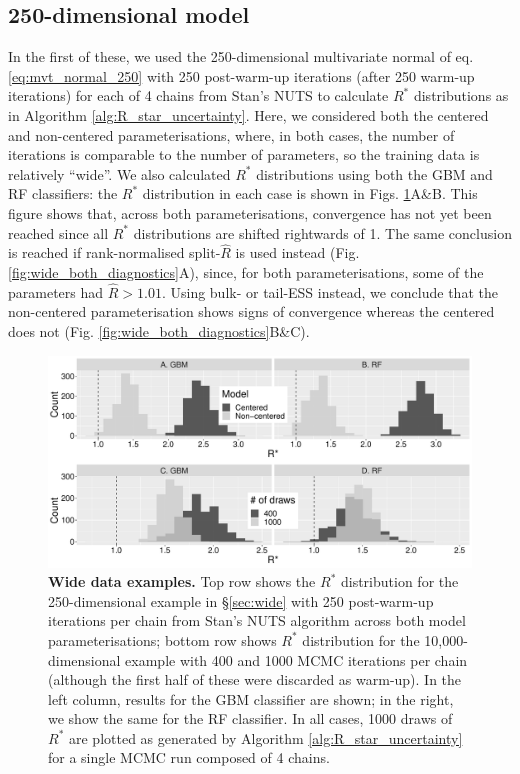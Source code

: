 \documentclass[ba]{imsart}
\numberwithin{equation}{section}
\theoremstyle{plain}
\begin{document}
\begin{supplement}
		\subsection{250-dimensional model}
		In the first of these, we used the 250-dimensional multivariate normal of eq. \eqref{eq:mvt_normal_250} with 250 post-warm-up iterations (after 250 warm-up iterations) for each of 4 chains from Stan's NUTS to calculate $R^*$ distributions as in Algorithm \ref{alg:R_star_uncertainty}. Here, we considered both the centered and non-centered parameterisations, where, in both cases, the number of iterations is comparable to the number of parameters, so the training data is relatively ``wide''. We also calculated $R^*$ distributions using both the GBM and RF classifiers: the $R^*$ distribution in each case is shown in Figs. \ref{fig:mvt_wide_both}A\&B. This figure shows that, across both parameterisations, convergence has not yet been reached since all $R^*$ distributions are shifted rightwards of 1. The same conclusion is reached if rank-normalised split-$\widehat{R}$ is used instead (Fig. \ref{fig:wide_both_diagnostics}A), since, for both parameterisations, some of the parameters had $\widehat{R}>1.01$. Using bulk- or tail-ESS instead, we conclude that the non-centered parameterisation shows signs of convergence whereas the centered does not (Fig. \ref{fig:wide_both_diagnostics}B\&C). 
		
		\begin{figure}[!htb]
			\centerline{\includegraphics[width=1\textwidth]{mvt_wide_both.pdf}}
			\caption{\textbf{Wide data examples.} Top row shows the $R^*$ distribution for the 250-dimensional example in \S\ref{sec:wide} with 250 post-warm-up iterations per chain from Stan's NUTS algorithm across both model parameterisations; bottom row shows $R^*$ distribution for the 10,000-dimensional example with 400 and 1000 MCMC iterations per chain (although the first half of these were discarded as warm-up). In the left column, results for the GBM classifier are shown; in the right, we show the same for the RF classifier. In all cases, 1000 draws of $R^*$ are plotted as generated by Algorithm \ref{alg:R_star_uncertainty} for a single MCMC run composed of 4 chains.}
			\label{fig:mvt_wide_both}
		\end{figure}
		

\end{supplement}
\end{document}
